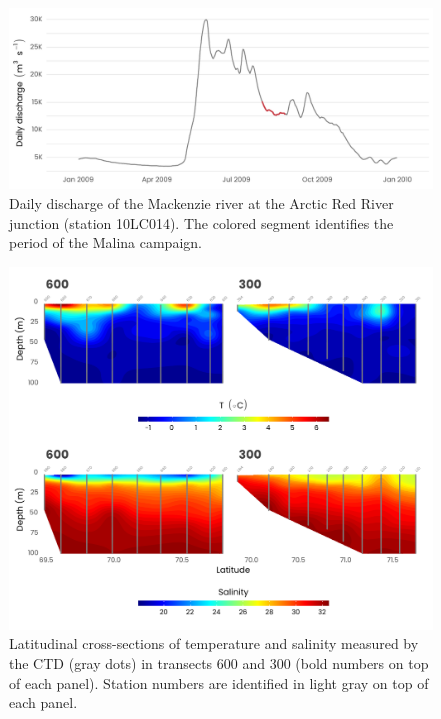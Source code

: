 \documentclass[essd, manuscript]{copernicus}
\begin{document}
\clearpage

\begin{figure}[H]
	\centering
	\includegraphics[scale = 1]{../../../graphs/fig02.pdf}
	\caption{Daily discharge of the Mackenzie river at the Arctic Red River junction (station 10LC014). The colored segment identifies the period of the Malina campaign.}
\end{figure}

\clearpage

\begin{figure}[H]
	\centering
	\includegraphics[scale = 1]{../../../graphs/fig03.pdf}
	\caption{Latitudinal cross-sections of temperature and salinity measured by the CTD (gray dots) in transects 600 and 300 (bold numbers on top of each panel). Station numbers are identified in light gray on top of each panel.}
\end{figure}

\clearpage
\end{document}
